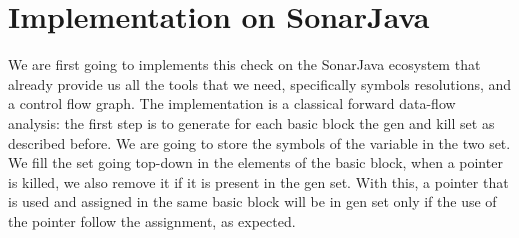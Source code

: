 \section{Implementation on SonarJava}
\label{sec:implementation_java}

We are first going to implements this check on the SonarJava ecosystem that already provide us all the tools that we need, specifically symbols resolutions, and a control flow graph.
The implementation is a classical forward data-flow analysis: the first step is to generate for each basic block the gen and kill set as described before. 
We are going to store the symbols of the variable in the two set. 
We fill the set going top-down in the elements of the basic block, when a pointer is killed, we also remove it if it is present in the gen set. 
With this, a pointer that is used and assigned in the same basic block will be in gen set only if the use of the pointer follow the assignment, as expected.

 


